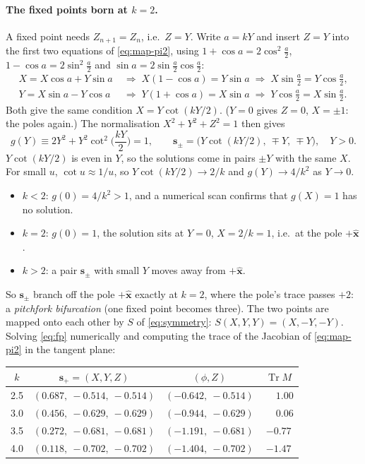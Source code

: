 \documentclass[11pt,a4paper]{article}
\newcommand{\vs}{\bm{s}}
\newcommand{\Tr}{\operatorname{Tr}}
\begin{document}
\paragraph{The fixed points born at $k=2$.} A fixed point needs $Z_{n+1} = Z_n$, i.e.\ $Z = Y$. Write $a = kY$ and
insert $Z = Y$ into the first two equations of \eqref{eq:map-pi2}, using $1 + \cos a = 2\cos^2\frac a2$, $1 - \cos a =
2\sin^2\frac a2$ and $\sin a = 2\sin\frac a2\cos\frac a2$:
\begin{align*}
  X = X\cos a + Y\sin a \;&\Longrightarrow\; X(1-\cos a) = Y\sin a \;\Longrightarrow\; X\sin\tfrac a2 = Y\cos\tfrac a2, \\
  Y = X\sin a - Y\cos a \;&\Longrightarrow\; Y(1+\cos a) = X\sin a \;\Longrightarrow\; Y\cos\tfrac a2 = X\sin\tfrac a2 .
\end{align*}
Both give the same condition $X = Y\cot(kY/2)$. ($Y = 0$ gives $Z = 0$, $X=\pm1$: the poles again.) The normalisation
$X^2 + Y^2 + Z^2 = 1$ then gives
\begin{equation}\label{eq:fp}
  g(Y) \equiv 2Y^2 + Y^2\cot^2\!\Big(\frac{kY}{2}\Big) = 1, \qquad \vs_\pm = \big(Y\cot(kY/2),\ \mp Y,\ \mp Y\big), \quad Y > 0.
\end{equation}
$Y\cot(kY/2)$ is even in $Y$, so the solutions come in pairs $\pm Y$ with the same $X$. For small $u$, $\cot u \approx
1/u$, so $Y\cot(kY/2) \to 2/k$ and $g(Y) \to 4/k^2$ as $Y\to0$.
\begin{itemize}
  \item $k < 2$: $g(0) = 4/k^2 > 1$, and a numerical scan confirms that $g(X) = 1$ has no solution.
  \item $k = 2$: $g(0) = 1$, the solution sits at $Y = 0$, $X = 2/k = 1$, i.e.\ at the pole $+\hat{\bm x}$.
  \item $k > 2$: a pair $\vs_\pm$ with small $Y$ moves away from $+\hat{\bm x}$.
\end{itemize}
So $\vs_\pm$ branch off the pole $+\hat{\bm x}$ exactly at $k = 2$, where the pole's trace passes $+2$: a
\emph{pitchfork bifurcation} (one fixed point becomes three). The two points are mapped onto each other by $S$ of
\eqref{eq:symmetry}: $S(X, Y, Y) = (X, -Y, -Y)$. Solving \eqref{eq:fp} numerically and computing the trace of the
Jacobian of \eqref{eq:map-pi2} in the tangent plane:

\begin{center}
\begin{tabular}{cccc}
\toprule
$k$ & $\vs_+ = (X,Y,Z)$ & $(\phi, Z)$ & $\Tr M$ \\
\midrule
2.5 & $(0.687,\ -0.514,\ -0.514)$ & $(-0.642,\ -0.514)$ & $\phantom{-}1.00$ \\
3.0 & $(0.456,\ -0.629,\ -0.629)$ & $(-0.944,\ -0.629)$ & $\phantom{-}0.06$ \\
3.5 & $(0.272,\ -0.681,\ -0.681)$ & $(-1.191,\ -0.681)$ & $-0.77$ \\
4.0 & $(0.118,\ -0.702,\ -0.702)$ & $(-1.404,\ -0.702)$ & $-1.47$ \\
\bottomrule
\end{tabular}
\end{center}
\end{document}
